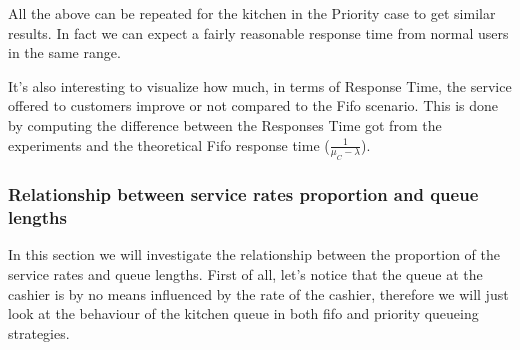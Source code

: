 All the above can be repeated for the kitchen in the Priority case to get similar results. In fact we can expect a fairly reasonable response time from normal users in the same range.

It's also interesting to visualize how much, in terms of Response Time, the service offered to customers improve or not compared to the Fifo scenario. This is done by computing the difference between the Responses Time got from the experiments and the theoretical Fifo response time ($\frac{1}{\mu_C-\lambda}$).


\subsubsection{Relationship between service rates proportion and queue lengths}
\label{sec:cashier_no_infl}

In this section we will investigate the relationship between the proportion of the service rates and queue lengths. First of all, let's notice that the queue at the cashier is by no means influenced by the rate of the cashier, therefore we will just look at the behaviour of the kitchen queue in both fifo and priority queueing strategies.

